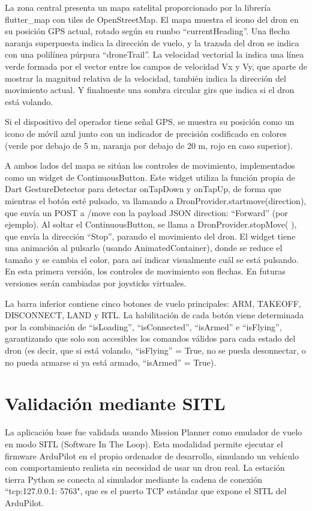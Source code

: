 La zona central presenta un mapa satelital proporcionado por la librería flutter\_map con tiles de OpenStreetMap. El mapa muestra el icono del dron en su posición GPS actual, rotado según su rumbo “currentHeading”. Una flecha naranja superpuesta indica la dirección de vuelo, y la trazada del dron se indica con una polilínea púrpura “droneTrail”. La velocidad vectorial la indica una línea verde formada por el vector entre los campos de velocidad Vx y Vy, que aparte de mostrar la magnitud relativa de la velocidad, también indica la dirección del movimiento actual. Y finalmente una sombra circular girs que indica si el dron está volando.

Si el dispositivo del operador tiene señal GPS, se muestra su posición como un icono de móvil azul junto con un indicador de precisión codificado en colores (verde por debajo de 5 m, naranja por debajo de 20 m, rojo en caso superior).

A ambos lados del mapa se sitúan los controles de movimiento, implementados como un widget de ContinuousButton. Este widget utiliza la función propia de Dart GestureDetector para detectar onTapDown y onTapUp, de forma que mientras el botón esté pulsado, va llamando a DronProvider.startmove(direction), que envía un POST a /move con la payload JSON {direction: “Forward”} (por ejemplo). Al soltar el ContinuousButton, se llama a DronProvider.stopMove( ), que envía la dirección “Stop”, parando el movimiento del dron.
El widget tiene una animación al pulsarlo (usando AnimatedContainer), donde se reduce el tamaño y se cambia el color, para así indicar visualmente cuál se está pulsando. 
En esta primera versión, los controles de movimiento son flechas. En futuras versiones serán cambiadas por joysticks virtuales.

La barra inferior contiene cinco botones de vuelo principales: ARM, TAKEOFF, DISCONNECT, LAND y RTL. La habilitación de cada botón viene determinada por la combinación de “isLoading”, “isConnected”, “isArmed” e “isFlying”, garantizando que solo son accesibles los comandos válidos para cada estado del dron (es decir, que si está volando, “isFlying” = True, no se pueda desonnectar, o no pueda armarse si ya está armado, “isArmed” = True).

\section{Validación mediante SITL}

La aplicación base fue validada usando Mission Planner como emulador de vuelo en modo SITL (Software In The Loop). Esta modalidad permite ejecutar el firmware ArduPilot en el propio ordenador de desarrollo, simulando un vehículo con comportamiento realista sin necesidad de usar un dron real. La estación tierra Python se conecta al simulador mediante la cadena de conexión “tcp:127.0.0.1: 5763", que es el puerto TCP estándar que expone el SITL del ArduPilot.

